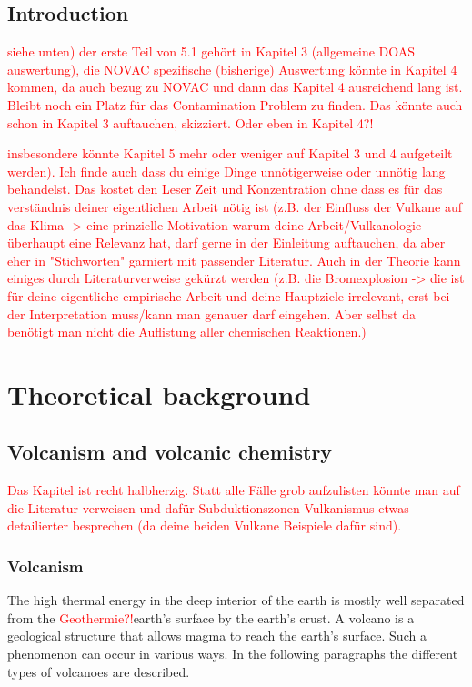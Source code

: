 \documentclass  [
  paper    = a4,
  BCOR     = 10mm,
  twoside,
  fontsize = 12pt,
  fleqn,
  toc      = bibnumbered,
  toc      = listofnumbered,
  numbers  = noendperiod,
  headings = normal,
  listof   = leveldown,
  version  = 3.03
]                                       {scrreprt}
\begin{document}
  

  \tableofcontents
	\chapter{Introduction}	
	\textcolor{red}{siehe unten) der erste Teil von 5.1 gehört in Kapitel 3 (allgemeine DOAS auswertung), die NOVAC spezifische (bisherige) Auswertung könnte in Kapitel 4 kommen, da auch bezug zu NOVAC und dann das Kapitel 4 ausreichend lang ist. Bleibt noch ein Platz für das Contamination Problem zu finden. Das könnte auch schon in Kapitel 3 auftauchen, skizziert. Oder eben in Kapitel 4?!}
	
	\textcolor{red}{insbesondere könnte Kapitel 5 mehr oder weniger auf Kapitel 3 und 4 aufgeteilt werden).
		Ich finde auch dass du einige Dinge unnötigerweise oder unnötig lang behandelst. Das kostet den Leser Zeit und Konzentration ohne dass es für das verständnis deiner eigentlichen Arbeit nötig ist (z.B. der Einfluss der Vulkane auf das Klima -> eine prinzielle Motivation warum deine Arbeit/Vulkanologie überhaupt eine Relevanz hat, darf gerne in der Einleitung auftauchen, da aber eher in "Stichworten" garniert mit passender Literatur. Auch in der Theorie kann einiges durch Literaturverweise gekürzt werden (z.B. die Bromexplosion -> die ist für deine eigentliche empirische Arbeit und deine Hauptziele irrelevant, erst bei der Interpretation muss/kann man genauer darf eingehen. Aber selbst da benötigt man nicht die Auflistung aller chemischen Reaktionen.)}
    \part{Theoretical background}
\chapter{Volcanism and volcanic chemistry}
\textcolor{red}{Das Kapitel ist recht halbherzig. Statt alle Fälle grob aufzulisten könnte man auf die Literatur verweisen und dafür Subduktionszonen-Vulkanismus etwas detailierter besprechen (da deine beiden Vulkane Beispiele dafür sind).}
\section{Volcanism}
The high thermal energy in the deep interior of the earth is mostly well separated from the \textcolor{red}{Geothermie?!}earth’s surface by the earth’s crust. A volcano is a geological structure that allows magma to reach the earth’s surface. Such a phenomenon can occur in various ways. In the following paragraphs the different types of volcanoes are described.
\end{document}
